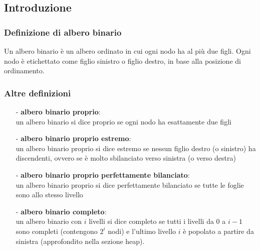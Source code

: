 \documentclass[a4paper]{article}
\begin{document}
\subsection{Introduzione}
\subsubsection*{Definizione di albero binario}
Un albero binario è un albero ordinato in cui ogni nodo ha al più due figli. Ogni nodo è etichettato come figlio sinistro o figlio
destro, in base alla posizione di ordinamento.

\subsubsection*{Altre definizioni}
\begin{itemize}[topsep=3pt, itemsep=0pt]
	\item[-] \textbf{albero binario proprio}: \\
	un albero binario si dice proprio se ogni nodo ha esattamente due figli
	\item[-] \textbf{albero binario proprio estremo}: \\
	un albero binario proprio si dice estremo se nessun figlio destro (o sinistro) ha discendenti, ovvero se è molto sbilanciato
	verso sinistra (o verso destra)
	\item[-] \textbf{albero binario proprio perfettamente bilanciato}: \\
	un albero binario proprio si dice perfettamente bilanciato se tutte le foglie sono allo stesso livello
	\item[-] \textbf{albero binario completo}: \\
	un albero binario con \(i\) livelli si dice completo se tutti i livelli da 0 a \(i-1\) sono completi (contengono \(2^i\) nodi)
	e l'ultimo livello \(i\) è popolato a partire da sinistra (approfondito nella sezione heap).
\end{itemize}
\end{document}
